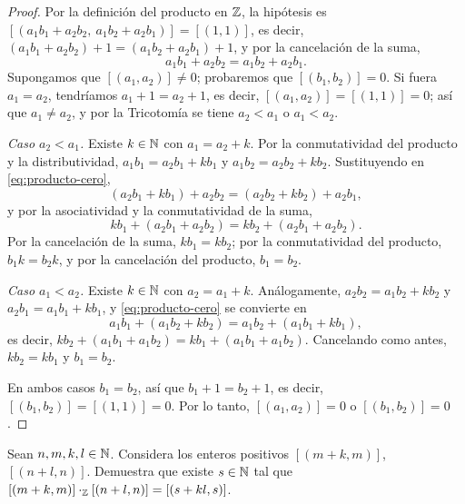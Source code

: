 \documentclass[12pt,a4paper]{article}
\begin{document}
    \begin{proof}
        Por la definición del producto en $\mathbb{Z}$, la hipótesis es $[(a_1b_1+a_2b_2,\ a_1b_2+a_2b_1)]=[(1,1)]$, es
        decir, $(a_1b_1+a_2b_2)+1=(a_1b_2+a_2b_1)+1$, y por la cancelación de la suma,
        \begin{equation}\label{eq:producto-cero}
            a_1b_1+a_2b_2=a_1b_2+a_2b_1.
        \end{equation}
        Supongamos que $[(a_1,a_2)]\neq0$; probaremos que $[(b_1,b_2)]=0$. Si fuera $a_1=a_2$, tendríamos
        $a_1+1=a_2+1$, es decir, $[(a_1,a_2)]=[(1,1)]=0$; así que $a_1\neq a_2$, y por
        la Tricotomía se tiene $a_2<a_1$ o $a_1<a_2$.

        \emph{Caso $a_2<a_1$.} Existe $k\in\mathbb{N}$ con $a_1=a_2+k$. Por la conmutatividad del producto y la
        distributividad, $a_1b_1=a_2b_1+kb_1$ y $a_1b_2=a_2b_2+kb_2$. Sustituyendo en \eqref{eq:producto-cero},
        \begin{equation*}
            (a_2b_1+kb_1)+a_2b_2=(a_2b_2+kb_2)+a_2b_1,
        \end{equation*}
        y por la asociatividad y la conmutatividad de la suma,
        \begin{equation*}
            kb_1+(a_2b_1+a_2b_2)=kb_2+(a_2b_1+a_2b_2).
        \end{equation*}
        Por la cancelación de la suma, $kb_1=kb_2$; por la conmutatividad del producto, $b_1k=b_2k$, y por la
        cancelación del producto, $b_1=b_2$.

        \emph{Caso $a_1<a_2$.} Existe $k\in\mathbb{N}$ con $a_2=a_1+k$. Análogamente, $a_2b_2=a_1b_2+kb_2$ y
        $a_2b_1=a_1b_1+kb_1$, y \eqref{eq:producto-cero} se convierte en
        \begin{equation*}
            a_1b_1+(a_1b_2+kb_2)=a_1b_2+(a_1b_1+kb_1),
        \end{equation*}
        es decir, $kb_2+(a_1b_1+a_1b_2)=kb_1+(a_1b_1+a_1b_2)$. Cancelando como antes, $kb_2=kb_1$ y $b_1=b_2$.

        En ambos casos $b_1=b_2$, así que $b_1+1=b_2+1$, es decir, $[(b_1,b_2)]=[(1,1)]=0$. Por lo tanto, $[(a_1,a_2)]=0$ o
        $[(b_1,b_2)]=0$.
    \end{proof}

    \begin{problema}
        Sean $n,m,k,l\in\mathbb{N}$. Considera los enteros positivos $[(m+k,m)]$, $[(n+l,n)]$. Demuestra que existe
        $s\in\mathbb{N}$ tal que $[(m+k,m)]\cdot_{\mathbb{Z}}[(n+l,n)]=[(s+kl,s)]$.
    \end{problema}
\end{document}
